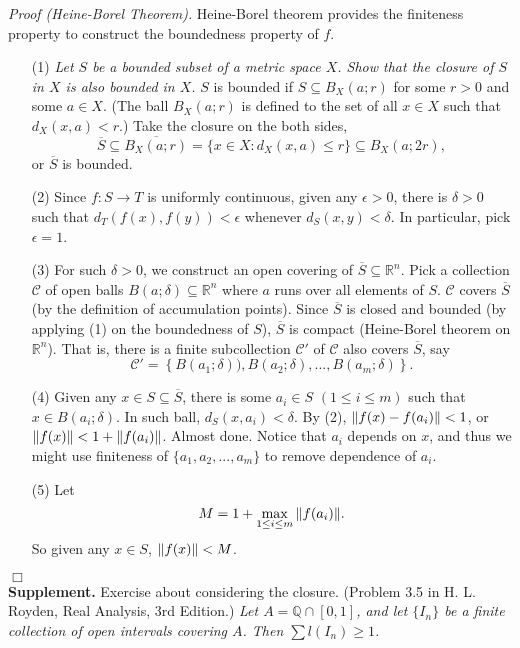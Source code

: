 \documentclass{article}
\begin{document}
\emph{Proof (Heine-Borel Theorem).}
Heine-Borel theorem provides the finiteness property to construct
the boundedness property of $f$.
\begin{enumerate}
\item[(1)]
\emph{Let $S$ be a bounded subset of a metric space $X$.
Show that the closure of $S$ in $X$ is also bounded in $X$.}
$S$ is bounded if $S \subseteq B_X(a;r)$ for some $r > 0$ and some $a \in X$.
(The ball $B_X(a;r)$ is defined to the set of all $x \in X$ such that
$d_X(x, a) < r$.)
Take the closure on the both sides,
$$\overline{S}
\subseteq \overline{B_X(a;r)}
= \{ x \in X : d_X(x, a) \leq r \}
\subseteq B_X(a;2r),$$
or $\overline{S}$ is bounded.
\item[(2)]
Since $f: S \rightarrow T$ is uniformly continuous,
given any $\epsilon > 0$, there is $\delta > 0$ such that
$d_T(f(x), f(y)) < \epsilon$ whenever $d_S(x, y) < \delta$.
In particular, pick $\epsilon = 1$.
\item[(3)]
For such $\delta > 0$, we construct an open covering of $\overline{S} \subseteq \mathbb{R}^n$.
Pick a collection $\mathscr{C}$ of open balls
$B(a;\delta) \subseteq \mathbb{R}^n$
where $a$ runs over all elements of $S$.
$\mathscr{C}$ covers $\overline{S}$ (by the definition of accumulation points).
Since $\overline{S} $ is closed and bounded (by applying (1) on the boundedness of $S$),
$\overline{S}$ is compact
(Heine-Borel theorem on $\mathbb{R}^n$).
That is, there is a finite subcollection $\mathscr{C}'$ of $\mathscr{C}$
also covers $\overline{S}$, say
$$\mathscr{C}'
= \left\{B(a_1;\delta)), B(a_2;\delta), ..., B(a_m;\delta) \right\}.$$
\item[(4)]
Given any $x \in S \subseteq \overline{S}$,
there is some $a_i \in S$ $(1 \leq i \leq m)$ such that $x \in B(a_i;\delta)$.
In such ball, $d_S(x, a_i) < \delta$.
By (2), $\norm{f(x) - f(a_i)} < 1$,
or $\norm{f(x)} < 1 + \norm{f(a_i)}$.
Almost done.
Notice that $a_i$ depends on $x$,
and thus we might use finiteness of $\{ a_1, a_2, ..., a_m \}$
to remove dependence of $a_i$.
\item[(5)]
Let
$$M = 1 + \max_{1 \leq i \leq m}{\norm{f(a_i)}}.$$
So given any $x \in S$, $\norm{f(x)} < M$.
\end{enumerate}
$\Box$ \\

\textbf{Supplement.}
Exercise about considering the closure.
(Problem 3.5 in H. L. Royden, Real Analysis, 3rd Edition.)
\emph{Let $A = \mathbb{Q} \cap [0,1]$,
and let $\{ I_n\}$ be a finite collection of open intervals covering $A$.
Then $\sum l(I_n) \geq 1$.} \\
\end{document}
